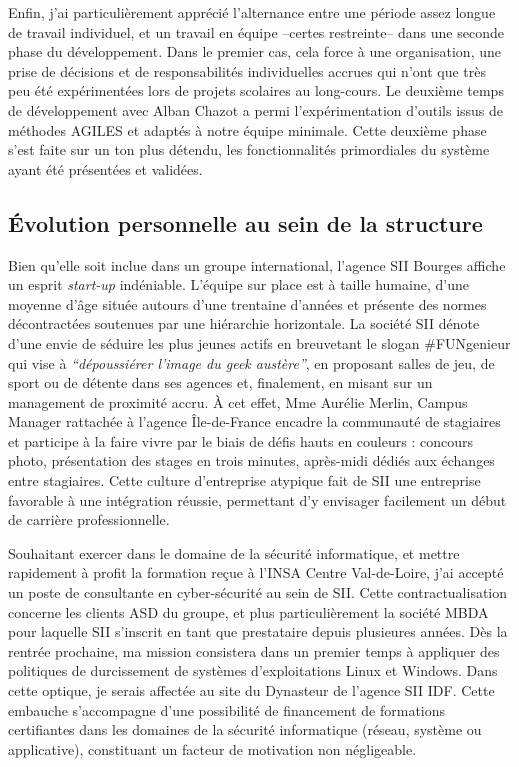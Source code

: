   Enfin, j'ai particulièrement apprécié l'alternance entre une période assez longue de travail individuel, et un travail en équipe --certes restreinte-- dans une seconde phase du développement. 
  Dans le premier cas, cela force à une organisation, une prise de décisions et de responsabilités individuelles accrues qui n'ont que très peu été expérimentées lors de projets scolaires au long-cours.
  Le deuxième temps de développement avec Alban Chazot a permi l'expérimentation d'outils issus de méthodes AGILES et adaptés à notre équipe minimale.  
  Cette deuxième phase s'est faite sur un ton plus détendu, les fonctionnalités primordiales du système ayant été présentées et validées. 
  
  \subsection{\'{E}volution personnelle au sein de la structure}
  
  Bien qu'elle soit inclue dans un groupe international, l'agence SII Bourges affiche un esprit \emph{start-up} indéniable. 
  L'équipe sur place est à taille humaine, d'une moyenne d'âge située autours d'une trentaine d'années et présente des normes décontractées soutenues par une hiérarchie horizontale.
  La société SII dénote d'une envie de séduire les plus jeunes actifs en breuvetant le slogan \#FUNgenieur qui vise à \emph{``dépoussiérer l'image du geek austère''}, en proposant salles de jeu, de sport ou de détente dans ses agences et, 
  finalement, en misant sur un management de proximité accru.
  \`{A} cet effet, Mme Aurélie Merlin, Campus Manager rattachée à l'agence Île-de-France encadre la communauté de stagiaires et participe à la faire vivre par le biais de défis hauts en couleurs : concours photo, présentation 
  des stages en trois minutes, après-midi dédiés aux échanges entre stagiaires. 
  Cette culture d'entreprise atypique fait de SII une entreprise favorable à une intégration réussie, permettant d'y envisager facilement un début de carrière professionnelle. 
  
  Souhaitant exercer dans le domaine de la sécurité informatique, et mettre rapidement à profit la formation reçue à l'INSA Centre Val-de-Loire, j'ai accepté un poste de consultante en cyber-sécurité au sein de SII.
  Cette contractualisation concerne les clients \gls{ASD} du groupe, et plus particulièrement la société MBDA pour laquelle SII s'inscrit en tant que prestataire depuis plusieures années. 
  Dès la rentrée prochaine, ma mission consistera dans un premier temps à appliquer des politiques de durcissement de systèmes d'exploitations Linux et Windows. 
  Dans cette optique, je serais affectée au site du Dynasteur de l'agence SII \gls{IDF}. 
  Cette embauche s'accompagne d'une possibilité de financement de formations certifiantes dans les domaines de la sécurité informatique (réseau, système ou applicative), constituant un facteur de motivation non négligeable.  
  